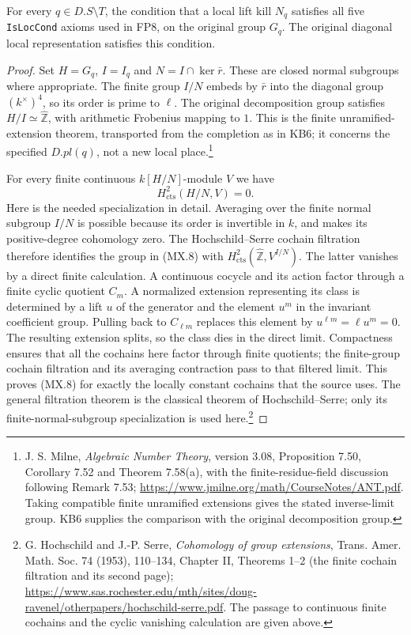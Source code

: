 \begin{proposition}
\label{claim:MX2}
For every $q\in D.S\setminus T$, the condition that a local
lift kill $N_q$ satisfies all five \texttt{IsLocCond} axioms
used in FP8, on the original group $G_q$.  The original
diagonal local representation satisfies this condition.
\end{proposition}
\begin{proof}
Set $H=G_q$, $I=I_q$ and $N=I\cap\ker\bar r$.
These are closed normal subgroups where appropriate.
The finite group $I/N$ embeds by $\bar r$ into the diagonal
group $(k^\times)^4$, so its order is prime to $\ell$.
The original decomposition group satisfies
$H/I\simeq\widehat{\mathbb Z}$, with arithmetic Frobenius
mapping to $1$.  This is the finite unramified-extension
theorem, transported from the completion as in KB6; it concerns
the specified $D.pl(q)$, not a new local place.\footnote{J. S. Milne,
\emph{Algebraic Number Theory}, version 3.08, Proposition 7.50,
Corollary 7.52 and Theorem 7.58(a), with the finite-residue-field
discussion following Remark 7.53;
\url{https://www.jmilne.org/math/CourseNotes/ANT.pdf}.
Taking compatible finite unramified extensions gives the stated
inverse-limit group.  KB6 supplies the comparison with the
original decomposition group.}

For every finite continuous $k[H/N]$-module $V$ we have
\[
                    H^2_{\mathrm{cts}}(H/N,V)=0.
 \tag{MX.8}
\]
Here is the needed specialization in detail.  Averaging over
the finite normal subgroup $I/N$ is possible because its order
is invertible in $k$, and makes its positive-degree cohomology
zero.  The Hochschild--Serre cochain filtration therefore
identifies the group in (MX.8) with
$H^2_{\mathrm{cts}}(\widehat{\mathbb Z},V^{I/N})$.
The latter vanishes by a direct finite calculation.  A
continuous cocycle and its action factor through a finite
cyclic quotient $C_m$.  A normalized extension representing
its class is determined by a lift $u$ of the generator and
the element $u^m$ in the invariant coefficient group.
Pulling back to $C_{\ell m}$ replaces this element by
$u^{\ell m}=\ell u^m=0$.  The resulting extension splits,
so the class dies in the direct limit.  Compactness ensures
that all the cochains here factor through finite quotients;
the finite-group cochain filtration and its averaging
contraction pass to that filtered limit.  This proves (MX.8)
for exactly the locally constant cochains that the source uses.
The general filtration theorem is the classical theorem of
Hochschild--Serre; only its finite-normal-subgroup specialization
is used here.\footnote{G. Hochschild and J.-P. Serre,
\emph{Cohomology of group extensions}, Trans. Amer. Math. Soc.
74 (1953), 110--134, Chapter II, Theorems 1--2
(the finite cochain filtration and its second page);
\url{https://www.sas.rochester.edu/mth/sites/doug-ravenel/otherpapers/hochschild-serre.pdf}.
The passage to continuous finite cochains and the cyclic
vanishing calculation are given above.}


\end{proof}
